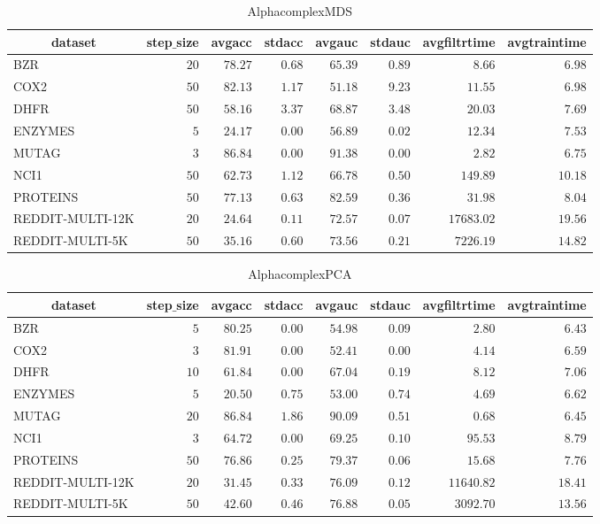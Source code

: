 \documentclass[]{article}
\begin{document}
\begin{table}[!tbp]
\caption{AlphacomplexMDS\label{AlphacomplexMDS}} 
{\centering
\begin{tabular}{lrrrrrrr}
\hline\hline
\multicolumn{1}{c}{dataset}&\multicolumn{1}{c}{step$\_$size}&\multicolumn{1}{c}{avgacc}&\multicolumn{1}{c}{stdacc}&\multicolumn{1}{c}{avgauc}&\multicolumn{1}{c}{stdauc}&\multicolumn{1}{c}{avgfiltrtime}&\multicolumn{1}{c}{avgtraintime}\tabularnewline
\hline
BZR&$20$&$78.27$&$0.68$&$65.39$&$0.89$&$    8.66$&$ 6.98$\tabularnewline
COX2&$50$&$82.13$&$1.17$&$51.18$&$9.23$&$   11.55$&$ 6.98$\tabularnewline
DHFR&$50$&$58.16$&$3.37$&$68.87$&$3.48$&$   20.03$&$ 7.69$\tabularnewline
ENZYMES&$ 5$&$24.17$&$0.00$&$56.89$&$0.02$&$   12.34$&$ 7.53$\tabularnewline
MUTAG&$ 3$&$86.84$&$0.00$&$91.38$&$0.00$&$    2.82$&$ 6.75$\tabularnewline
NCI1&$50$&$62.73$&$1.12$&$66.78$&$0.50$&$  149.89$&$10.18$\tabularnewline
PROTEINS&$50$&$77.13$&$0.63$&$82.59$&$0.36$&$   31.98$&$ 8.04$\tabularnewline
REDDIT-MULTI-12K&$20$&$24.64$&$0.11$&$72.57$&$0.07$&$17683.02$&$19.56$\tabularnewline
REDDIT-MULTI-5K&$50$&$35.16$&$0.60$&$73.56$&$0.21$&$ 7226.19$&$14.82$\tabularnewline
\hline
\end{tabular}}
\end{table}
\begin{table}[!tbp]
\caption{AlphacomplexPCA\label{AlphacomplexPCA}} 
{\centering
\begin{tabular}{lrrrrrrr}
\hline\hline
\multicolumn{1}{c}{dataset}&\multicolumn{1}{c}{step$\_$size}&\multicolumn{1}{c}{avgacc}&\multicolumn{1}{c}{stdacc}&\multicolumn{1}{c}{avgauc}&\multicolumn{1}{c}{stdauc}&\multicolumn{1}{c}{avgfiltrtime}&\multicolumn{1}{c}{avgtraintime}\tabularnewline
\hline
BZR&$ 5$&$80.25$&$0.00$&$54.98$&$0.09$&$    2.80$&$ 6.43$\tabularnewline
COX2&$ 3$&$81.91$&$0.00$&$52.41$&$0.00$&$    4.14$&$ 6.59$\tabularnewline
DHFR&$10$&$61.84$&$0.00$&$67.04$&$0.19$&$    8.12$&$ 7.06$\tabularnewline
ENZYMES&$ 5$&$20.50$&$0.75$&$53.00$&$0.74$&$    4.69$&$ 6.62$\tabularnewline
MUTAG&$20$&$86.84$&$1.86$&$90.09$&$0.51$&$    0.68$&$ 6.45$\tabularnewline
NCI1&$ 3$&$64.72$&$0.00$&$69.25$&$0.10$&$   95.53$&$ 8.79$\tabularnewline
PROTEINS&$50$&$76.86$&$0.25$&$79.37$&$0.06$&$   15.68$&$ 7.76$\tabularnewline
REDDIT-MULTI-12K&$20$&$31.45$&$0.33$&$76.09$&$0.12$&$11640.82$&$18.41$\tabularnewline
REDDIT-MULTI-5K&$50$&$42.60$&$0.46$&$76.88$&$0.05$&$ 3092.70$&$13.56$\tabularnewline
\hline
\end{tabular}}
\end{table}
\end{document}

